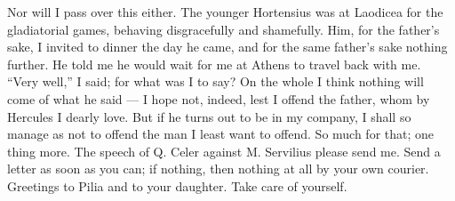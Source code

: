  Nor will I pass over this either. The younger Hortensius was at Laodicea for the gladiatorial games, behaving disgracefully and shamefully. Him, for the father's sake, I invited to dinner the day he came, and for the same father's sake nothing further. He told me he would wait for me at Athens to travel back with me. ``Very well,'' I said; for what was I to say? On the whole I think nothing will come of what he said --- I hope not, indeed, lest I offend the father, whom by Hercules I dearly love. But if he turns out to be in my company, I shall so manage as not to offend the man I least want to offend. So much for that; one thing more. The speech of Q. Celer against M. Servilius please send me. Send a letter as soon as you can; if nothing, then nothing at all by your own courier. Greetings to Pilia and to your daughter. Take care of yourself.
